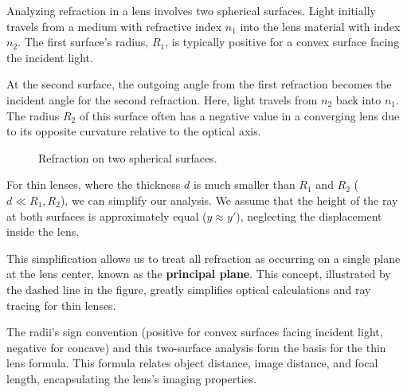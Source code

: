 \documentclass[
  a4paper,
]{book}
\begin{document}
Analyzing refraction in a lens involves two spherical surfaces. Light
initially travels from a medium with refractive index \(n_1\) into the
lens material with index \(n_2\). The first surface's radius, \(R_1\),
is typically positive for a convex surface facing the incident light.

At the second surface, the outgoing angle from the first refraction
becomes the incident angle for the second refraction. Here, light
travels from \(n_2\) back into \(n_1\). The radius \(R_2\) of this
surface often has a negative value in a converging lens due to its
opposite curvature relative to the optical axis.

\begin{figure}


\caption{\label{fig-thin-lens-refraction}Refraction on two spherical
surfaces.}

\end{figure}%

For thin lenses, where the thickness \(d\) is much smaller than \(R_1\)
and \(R_2\) (\(d \ll R_1, R_2\)), we can simplify our analysis. We
assume that the height of the ray at both surfaces is approximately
equal (\(y \approx y'\)), neglecting the displacement inside the lens.

This simplification allows us to treat all refraction as occurring on a
single plane at the lens center, known as the \textbf{principal plane}.
This concept, illustrated by the dashed line in the figure, greatly
simplifies optical calculations and ray tracing for thin lenses.

The radii's sign convention (positive for convex surfaces facing
incident light, negative for concave) and this two-surface analysis form
the basis for the thin lens formula. This formula relates object
distance, image distance, and focal length, encapsulating the lens's
imaging properties.
\end{document}
